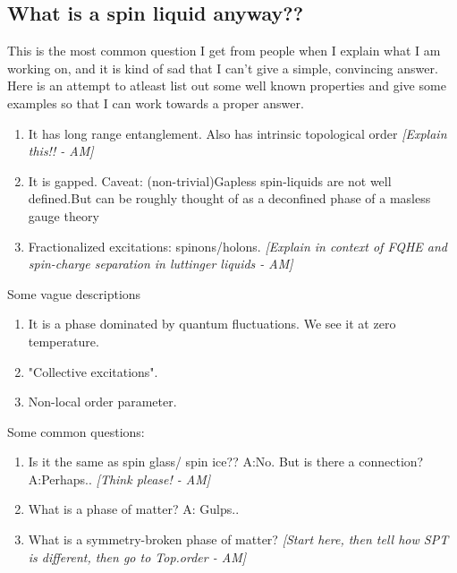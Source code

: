\documentclass{article}
\newcommand\AM[1]{{\it \color{darkblue}  [#1 - AM]}}
\begin{document}
\subsection{What is a spin liquid anyway??}
This is the most common question I get from people when I explain what I am working on, and it is kind of sad that I can't give a simple, convincing answer. Here is an attempt to atleast list out some well known properties and give some examples so that I can work towards a proper answer.
\begin{enumerate}
    \item It has long range entanglement. Also has intrinsic topological order \AM{Explain this!!}
    \item It is gapped. Caveat: (non-trivial)Gapless spin-liquids are not well defined.But can be roughly thought of as a deconfined phase of a masless gauge theory
    \item Fractionalized excitations: spinons/holons. \AM{Explain in context of FQHE and spin-charge separation in luttinger liquids}
\end{enumerate}
Some vague descriptions
\begin{enumerate}
    \item It is a phase dominated by quantum fluctuations. We see it at zero temperature.
    \item "Collective excitations".
    \item Non-local order parameter.
\end{enumerate}
Some common questions:
\begin{enumerate}
    \item Is it the same as spin glass/ spin ice?? A:No. But is there a connection? A:Perhaps..\AM{Think please!}
    \item What is a phase of matter? A: Gulps..
    \item What is a symmetry-broken phase of matter? \AM{Start here, then tell how SPT is different, then go to Top.order}
\end{enumerate}


\end{document}
